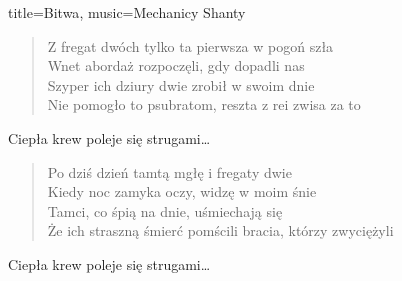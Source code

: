 \begin{song}{title={Bitwa}, music={Mechanicy Shanty}}
\begin{multicols}{2}
\begin{verse}
        Z fregat dwóch tylko ta pierwsza w pogoń szła \\
        Wnet abordaż rozpoczęli, gdy dopadli nas \\
        Szyper ich dziury dwie zrobił w swoim dnie \\
        Nie pomogło to psubratom, reszta z rei zwisa za to
    \end{verse}
    \begin{chorus}
        Ciepła krew poleje się strugami\ldots
    \end{chorus}
    \begin{verse}
        Po dziś dzień tamtą mgłę i fregaty dwie \\
        Kiedy noc zamyka oczy, widzę w moim śnie \\
        Tamci, co śpią na dnie, uśmiechają się \\
        Że ich straszną śmierć pomścili bracia, którzy zwyciężyli
    \end{verse}
    \begin{chorus}
        Ciepła krew poleje się strugami\ldots
    \end{chorus}
\end{multicols}
\end{song}

